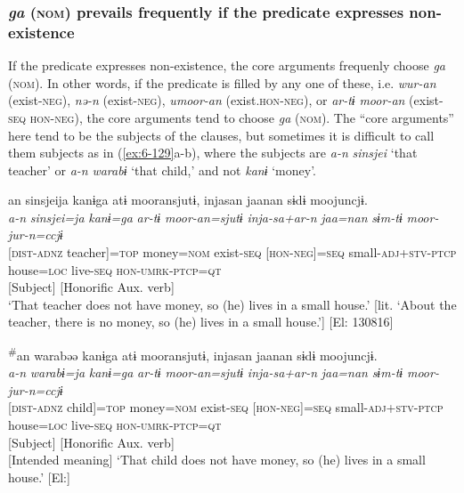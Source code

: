 \subsubsection{\textit{ga} (\textsc{nom}) prevails frequently if the predicate expresses non-existence}

If the predicate expresses non-existence, the core arguments frequenly choose \textit{ga} (\textsc{nom}). In other words, if the predicate is filled by any one of these, i.e. \textit{wur-an} (exist-\textsc{neg}), \textit{nə-n} (exist-\textsc{neg}), \textit{umoor-an} (exist.\textsc{hon}-\textsc{neg}), or \textit{ar-tɨ} \textit{moor-an} (exist-\textsc{seq} \textsc{hon}-\textsc{neg}), the core arguments tend to choose \textit{ga} (\textsc{nom}). The “core arguments” here tend to be the subjects of the clauses, but sometimes it is difficult to call them subjects as in (\ref{ex:6-129}a-b), where the subjects are \textit{a-n} \textit{sinsjei} ‘that teacher’ or \textit{a-n} \textit{warabɨ} ‘that child,’ and not \textit{kanɨ} ‘money’.

\ea\label{ex:6-129}
\ea
{\TM}
\gllll an  sinsjeija  kanɨga  atɨ  mooransjutɨ,     injasan  jaanan  sɨdɨ  moojuncjɨ.\\
\textit{a-n}  \textit{sinsjei=ja}  \textit{kanɨ=ga}  \textit{ar-tɨ}  \textit{moor-an=sjutɨ}     \textit{inja-sa+ar-n}  \textit{jaa=nan}  \textit{sɨm-tɨ}  \textit{moor-jur-n=ccjɨ}\\
      {}[\textsc{dist}-\textsc{adnz}  teacher]=\textsc{top}  money=\textsc{nom}  exist-\textsc{seq}  [\textsc{hon}-\textsc{neg}]=\textsc{seq}   small-\textsc{adj}+\textsc{stv}-\textsc{ptcp}  house=\textsc{loc}  live-\textsc{seq}  \textsc{hon}-\textsc{umrk}-\textsc{ptcp}=\textsc{qt}\\
      {}[Subject]      [Honorific Aux. verb]\\
\glt ‘That teacher does not have money, so (he) lives in a small house.’
[lit. ‘About the teacher, there is no money, so (he) lives in a small house.’]       [El: 130816]

\ex

{\TM}
\glll \textsuperscript{\#}an  warabəə  kanɨga  atɨ  mooransjutɨ,   injasan  jaanan  sɨdɨ  moojuncjɨ.\\
      \textit{a-n}  \textit{warabɨ=ja}  \textit{kanɨ=ga}  \textit{ar-tɨ}  \textit{moor-an=sjutɨ}     \textit{inja-sa+ar-n}  \textit{jaa=nan}  \textit{sɨm-tɨ}  \textit{moor-jur-n=ccjɨ}\\
      {}[\textsc{dist}-\textsc{adnz}  child]=\textsc{top}  money=\textsc{nom}  exist-\textsc{seq}  [\textsc{hon}-\textsc{neg}]=\textsc{seq}      small-\textsc{adj}+\textsc{stv}-\textsc{ptcp}  house=\textsc{loc}  live-\textsc{seq}  \textsc{hon}-\textsc{umrk}-\textsc{ptcp}=\textsc{qt}\\
      {}[Subject]      [Honorific Aux. verb]\\
\glt{}      [Intended meaning] ‘That child does not have money, so (he) lives in a small house.’ [El:]
\z
\z

